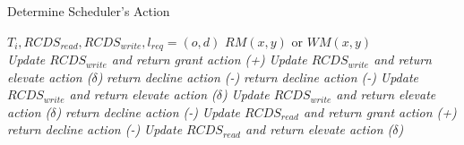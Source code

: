 \documentclass[conference]{IEEEtran}
\begin{document}
\begin{algorithm}
\caption{Determine Scheduler's Action}
\label{alg:determine_sched_action}
\begin{algorithmic}[1]
\Require $T_{i}, RCDS_{read}, RCDS_{write}, l_{req} = (o,d)$
\Ensure $RM(x,y)$ or $WM(x,y)$
    \\
    \label{l1}
        \label{l2}
            \label{l3}
                \State \textit{Update $RCDS_{write}$ and return grant action (+)}\label{l4}
            \label{l5}
                \State \textit{Update $RCDS_{write}$ and return elevate action ($\delta$)}\label{l6}
            \Else
                \State \textit{return decline action (-)}\label{l7}
            \EndIf
        \Else
                \State \textit{return decline action (-)}
            \Else
                    \State \textit{Update $RCDS_{write}$ and return elevate action ($\delta$)}
                    \State \textit{Update $RCDS_{write}$ and return elevate action ($\delta$)}
                \Else
                    \State \textit{return decline action (-)}
                \EndIf
            \EndIf
        \EndIf
    \Else 
            \State \textit{Update $RCDS_{read}$ and return grant action (+)}
        \Else 
                \State \textit{return decline action (-)}
            \Else
                \State \textit{Update $RCDS_{read}$ and return elevate action ($\delta$)}
            \EndIf
        \EndIf
    \EndIf
    \\
\EndFunction

\end{algorithmic}
\end{algorithm}
\end{document}
